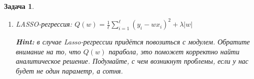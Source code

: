 \documentclass[a4paper,12pt]{article}
\theoremstyle{mystyle}
\newtheorem{esProblem}{Задача}
\begin{document}
\begin{esProblem}
\begin{enumerate}
    Для нахождения минимума $Q(w)$ найдем её производную по $w$ и приравняем её к $0$:
\[
\begin{gathered}
    \frac{\partial Q}{\partial w} = 0 \\
    \frac{\partial}{\partial w} \left[\frac{1}{\ell} \sum_{i=1}^{\ell} (y_i - w x_i)^2 + \lambda w^2\right] = 0 \\
    \frac{\partial}{\partial w} \left[\frac{1}{\ell} \sum_{i=1}^{\ell} (y_i^2 - 2w x_i y_i + w^2 x_i^2) + \lambda w^2\right] = 0 \\
    \frac{1}{\ell} \sum_{i=1}^{\ell} (2w x_i^2 - 2y_ix_i) + 2\lambda w = 0 \\
    -\frac{2}{\ell} \left[ \sum_{i=1}^{\ell} y_i x_i - w \sum_{i=1}^{\ell} x_i \right] + 2\lambda w = 0 \\
    w \left[ \frac{2}{\ell} \sum_{i=1}^{\ell} x_i + 2\lambda \right] - \frac{2}{\ell} \sum_{i=1}^{\ell} y_i x_i = 0 \\
    w = \dfrac{\sum_{i=1}^{\ell} y_i x_i}{\sum_{i=1}^{\ell} x_i + \frac{\ell}{2} \cdot 2\lambda} = \dfrac{\sum_{i=1}^{\ell} y_i x_i}{\sum_{i=1}^{\ell} x_i + \lambda \ell} 
\end{gathered}
\]
    
    \item LASSO-регрессия: $Q(w) = \frac{1}{\ell} \sum_{i=1}^{\ell} (y_i - w x_i)^2 + \lambda |w|$ 

    \textbf{Hint:} в случае Lasso-регрессии придётся повозиться с модулем. Обратите внимание на то, что $Q(w)$ парабола, это поможет корректно найти аналитическое решение. Подумайте, с чем возникнут проблемы, если у нас будет не один параметр, а сотня.
    

\end{enumerate}
\end{esProblem}
\end{document}
